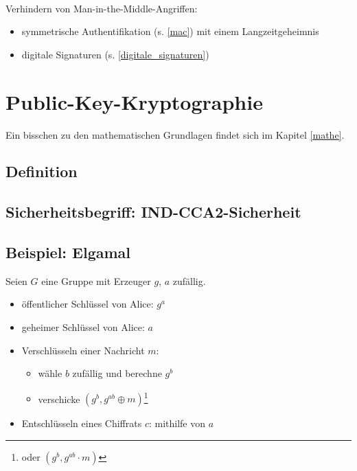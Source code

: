 \documentclass[a4paper,twoside,DIV15,BCOR12mm]{scrbook}
\begin{document}
\\

Verhindern von Man-in-the-Middle-Angriffen:

\begin{itemize}
	\item symmetrische Authentifikation (s. \ref{mac}) mit einem Langzeitgeheimnis
	\item digitale Signaturen (s. \ref{digitale_signaturen})
\end{itemize}


\chapter{Public-Key-Kryptographie}

Ein bisschen zu den mathematischen Grundlagen findet sich im Kapitel \ref{mathe}.

\section{Definition}


\section{Sicherheitsbegriff: IND-CCA2-Sicherheit}


\section{Beispiel: Elgamal}

Seien $G$ eine Gruppe mit Erzeuger $g$, $a$ zufällig.

\begin{itemize}
	\item öffentlicher Schlüssel von Alice: $g^a$
	\item geheimer Schlüssel von Alice: $a$
	\item Verschlüsseln einer Nachricht $m$: 
		\begin{itemize}
			\item wähle $b$ zufällig und berechne $g^b$
			\item verschicke $(g^b, g^{ab} \oplus m)$\footnote{oder $(g^b, g^{ab} \cdot m)$}
		\end{itemize}
	\item Entschlüsseln eines Chiffrats $c$: mithilfe von $a$
\end{itemize}
\end{document}
